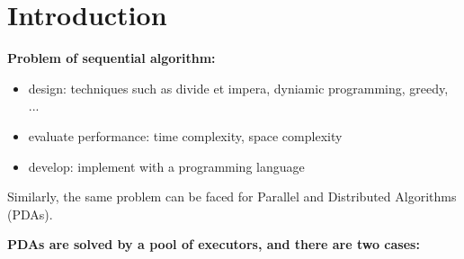\section{Introduction}

\textbf{Problem of sequential algorithm:}

\begin{itemize}
 \item design: techniques such as divide et impera, dyniamic programming, greedy, ...
 \item evaluate performance: time complexity, space complexity
 \item develop: implement with a programming language
\end{itemize}

Similarly, the same problem can be faced for Parallel and Distributed Algorithms (PDAs).

\textbf{PDAs are solved by a pool of executors, and there are two cases:}

